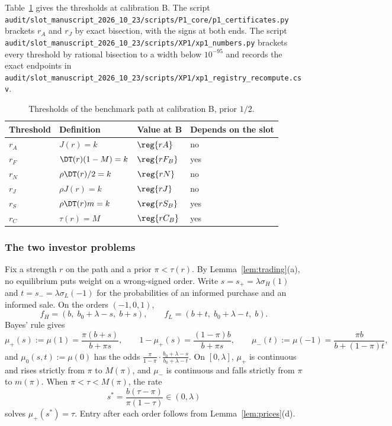 Table~\ref{tab:a4-thresholds} gives the thresholds at calibration B. The script
\nolinkurl{audit/slot_manuscript_2026_10_23/scripts/P1_core/p1_certificates.py} brackets \(r_A\) and \(r_J\) by
exact bisection, with the signs at both ends. The script
\nolinkurl{audit/slot_manuscript_2026_10_23/scripts/XP1/xp1_numbers.py} brackets every threshold by rational
bisection to a width below \(10^{-95}\) and records the exact endpoints in
\nolinkurl{audit/slot_manuscript_2026_10_23/scripts/XP1/xp1_registry_recompute.csv}.

\begin{table}[ht]
\centering
\caption{Thresholds of the benchmark path at calibration B, prior \(1/2\).}\label{tab:a4-thresholds}
\small
\begin{tabular}{@{}llll@{}}
\toprule
Threshold & Definition & Value at B & Depends on the slot\\
\midrule
\(r_A\) & \(J(r)=k\) & \(\reg{rA}\) & no\\
\(r_F\) & \(\DT(r)(1-M)=k\) & \(\reg{rF_B}\) & yes\\
\(r_N\) & \(\rho\DT(r)/2=k\) & \(\reg{rN}\) & no\\
\(r_J\) & \(\rho J(r)=k\) & \(\reg{rJ}\) & no\\
\(r_S\) & \(\rho\DT(r)m=k\) & \(\reg{rS_B}\) & yes\\
\(r_C\) & \(\tau(r)=M\) & \(\reg{rC_B}\) & yes\\
\bottomrule
\end{tabular}
\end{table}

\subsubsection*{The two investor problems}

Fix a strength \(r\) on the path and a prior \(\pi<\tau(r)\). By Lemma~\ref{lem:trading}(a), no equilibrium puts
weight on a wrong-signed order. Write \(s=s_+=\lambda\sigma_H(1)\) and \(t=s_-=\lambda\sigma_L(-1)\) for the
probabilities of an informed purchase and an informed sale. On the orders \((-1,0,1)\),
\[
f_H=(b,\;b_0+\lambda-s,\;b+s),\qquad f_L=(b+t,\;b_0+\lambda-t,\;b).
\]
Bayes' rule gives
\[
\mu_+(s):=\mu(1)=\frac{\pi(b+s)}{b+\pi s},\qquad 1-\mu_+(s)=\frac{(1-\pi)b}{b+\pi s},\qquad
\mu_-(t):=\mu(-1)=\frac{\pi b}{b+(1-\pi)t},
\]
and \(\mu_0(s,t):=\mu(0)\) has the odds \(\frac{\pi}{1-\pi}\cdot\frac{b_0+\lambda-s}{b_0+\lambda-t}\). On
\([0,\lambda]\), \(\mu_+\) is continuous and rises strictly from \(\pi\) to \(M(\pi)\), and \(\mu_-\) is continuous
and falls strictly from \(\pi\) to \(m(\pi)\). When \(\pi<\tau<M(\pi)\), the rate
\[
s^*=\frac{b(\tau-\pi)}{\pi(1-\tau)}\in(0,\lambda)
\]
solves \(\mu_+(s^*)=\tau\). Entry after each order follows from Lemma~\ref{lem:prices}(d).

